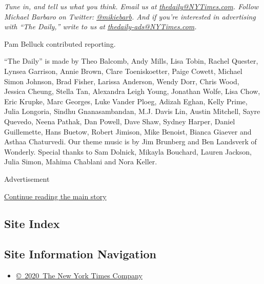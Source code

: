 \emph{Tune in, and tell us what you think. Email us at}
\href{mailto:thedaily@NYTimes.com}{\emph{thedaily@NYTimes.com}}\emph{.
Follow Michael Barbaro on Twitter:}
\href{https://twitter.com/mikiebarb}{\emph{@mikiebarb}}\emph{. And if
you're interested in advertising with ``The Daily,'' write to us at}
\href{mailto:thedaily-ads@NYTimes.com}{\emph{thedaily-ads@NYTimes.com}}\emph{.}

Pam Belluck contributed reporting.

``The Daily'' is made by Theo Balcomb, Andy Mills, Lisa Tobin, Rachel
Quester, Lynsea Garrison, Annie Brown, Clare Toeniskoetter, Paige
Cowett, Michael Simon Johnson, Brad Fisher, Larissa Anderson, Wendy
Dorr, Chris Wood, Jessica Cheung, Stella Tan, Alexandra Leigh Young,
Jonathan Wolfe, Lisa Chow, Eric Krupke, Marc Georges, Luke Vander Ploeg,
Adizah Eghan, Kelly Prime, Julia Longoria, Sindhu Gnanasambandan, M.J.
Davis Lin, Austin Mitchell, Sayre Quevedo, Neena Pathak, Dan Powell,
Dave Shaw, Sydney Harper, Daniel Guillemette, Hans Buetow, Robert
Jimison, Mike Benoist, Bianca Giaever and Asthaa Chaturvedi. Our theme
music is by Jim Brunberg and Ben Landsverk of Wonderly. Special thanks
to Sam Dolnick, Mikayla Bouchard, Lauren Jackson, Julia Simon, Mahima
Chablani and Nora Keller.

Advertisement

\protect\hyperlink{after-bottom}{Continue reading the main story}

\hypertarget{site-index}{%
\subsection{Site Index}\label{site-index}}

\hypertarget{site-information-navigation}{%
\subsection{Site Information
Navigation}\label{site-information-navigation}}

\begin{itemize}
\tightlist
\item
  \href{https://help.nytimes3xbfgragh.onion/hc/en-us/articles/115014792127-Copyright-notice}{©~2020~The
  New York Times Company}
\end{itemize}

